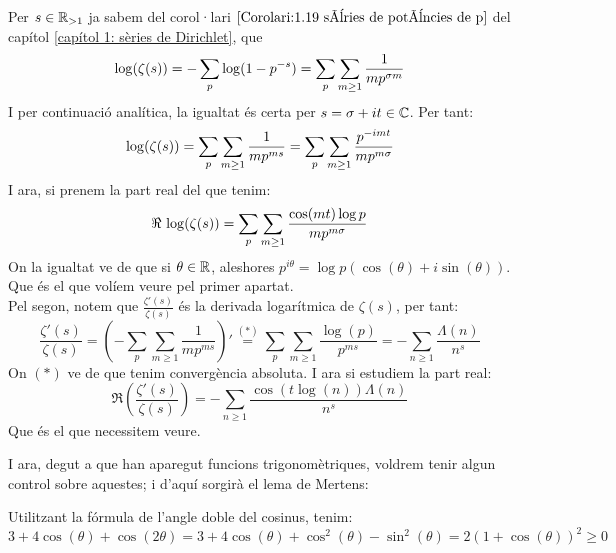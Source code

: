 \vspace{7mm}
\begin{pf}
    Per $s\in\mathbb R_{>1}$ ja sabem del corol·lari $\ref{Corolari:1.19 sèries de potències de p}$ del capítol \ref{capítol 1: sèries de Dirichlet}, que 
    \[
        \log(\zeta(s))=-\sum_{p}\log(1-p^{-s})=\sum_p\sum_{m\geq 1}\frac{1}{mp^{\sigma m}}
    \]
    I per continuació analítica, la igualtat és certa per $s=\sigma+it\in \mathbb C$. Per tant:
    \[
        \log(\zeta(s))=\sum_p\sum_{m\geq1}\frac{1}{mp^{ms}}=\sum_p\sum_{m\geq1}\frac{p^{-im t}}{mp^{m\sigma}}
    \]
    I ara, si prenem la part real del que tenim:
    \[
        \Re\,\log(\zeta(s))=\sum_p\sum_{m\geq1}\frac{\cos(mt)\log p}{mp^{m\sigma}}
    \]
    On la igualtat ve de que si $\theta\in\mathbb R$, aleshores $p^{i\theta}=\log p(\cos(\theta)+i\sin(\theta))$.
    Que és el que volíem veure pel primer apartat.\\
    Pel segon, notem que $\frac{\zeta'(s)}{\zeta(s)}$ és la derivada logarítmica de $\zeta(s)$, per tant:
    \[
        \frac{\zeta'(s)}{\zeta(s)}=
        \left(-\sum_p\sum_{m\geq1}\frac{1}{mp^{ms}}\right)'\overset{(*)}{=}
        \sum_p\sum_{m\geq1}\frac{\log(p)}{p^{ms}}=-\sum_{n\geq1}\frac{\Lambda(n)}{n^s}
    \]
    On $(*)$ ve de que tenim convergència absoluta. I ara si estudiem la part real:
    \[
        \Re\left(\frac{\zeta'(s)}{\zeta(s)}\right)=
        -\sum_{n\geq1}\frac{\cos(t\log(n))\Lambda(n)}{n^s}
    \]
    Que és el que necessitem veure.
\end{pf}
I ara, degut a que han aparegut funcions trigonomètriques, voldrem tenir algun control sobre aquestes; i d'aquí sorgirà el lema de Mertens:
\begin{pf}
    Utilitzant la fórmula de l'angle doble del cosinus, tenim:
    \[
        3+4\cos(\theta)+\cos(2\theta)=
        3+4\cos(\theta)+\cos^2(\theta)-\sin^2(\theta)=
        2(1+\cos(\theta))^2\geq0
    \]
\end{pf}
